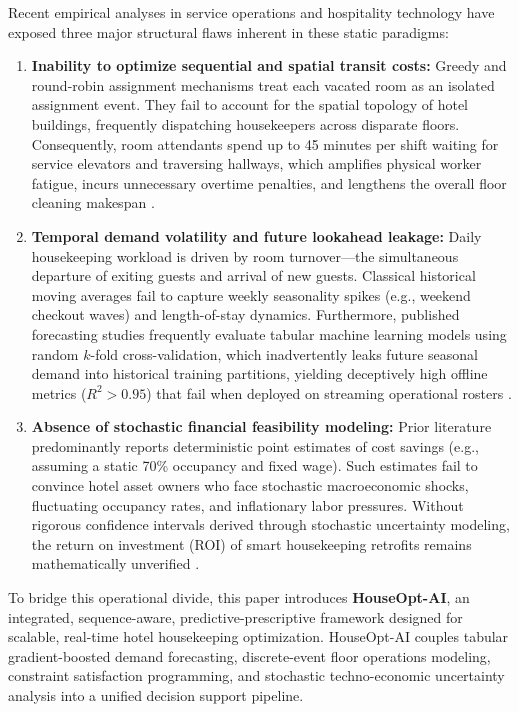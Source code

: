 \documentclass[11pt,a4paper]{article}
\begin{document}
Recent empirical analyses in service operations and hospitality technology have exposed three major structural flaws inherent in these static paradigms:
\begin{enumerate}
    \item \textbf{Inability to optimize sequential and spatial transit costs:} Greedy and round-robin assignment mechanisms treat each vacated room as an isolated assignment event. They fail to account for the spatial topology of hotel buildings, frequently dispatching housekeepers across disparate floors. Consequently, room attendants spend up to 45 minutes per shift waiting for service elevators and traversing hallways, which amplifies physical worker fatigue, incurs unnecessary overtime penalties, and lengthens the overall floor cleaning makespan \cite{chan2013,pizam2017}.
    \item \textbf{Temporal demand volatility and future lookahead leakage:} Daily housekeeping workload is driven by room turnover—the simultaneous departure of exiting guests and arrival of new guests. Classical historical moving averages fail to capture weekly seasonality spikes (e.g., weekend checkout waves) and length-of-stay dynamics. Furthermore, published forecasting studies frequently evaluate tabular machine learning models using random $k$-fold cross-validation, which inadvertently leaks future seasonal demand into historical training partitions, yielding deceptively high offline metrics ($R^2 > 0.95$) that fail when deployed on streaming operational rosters \cite{antonio2019,ampountolas2023}.
    \item \textbf{Absence of stochastic financial feasibility modeling:} Prior literature predominantly reports deterministic point estimates of cost savings (e.g., assuming a static 70\% occupancy and fixed wage). Such estimates fail to convince hotel asset owners who face stochastic macroeconomic shocks, fluctuating occupancy rates, and inflationary labor pressures. Without rigorous confidence intervals derived through stochastic uncertainty modeling, the return on investment (ROI) of smart housekeeping retrofits remains mathematically unverified \cite{lee2018,sainaghi2021}.
\end{enumerate}

To bridge this operational divide, this paper introduces \textbf{HouseOpt-AI}, an integrated, sequence-aware, predictive-prescriptive framework designed for scalable, real-time hotel housekeeping optimization. HouseOpt-AI couples tabular gradient-boosted demand forecasting, discrete-event floor operations modeling, constraint satisfaction programming, and stochastic techno-economic uncertainty analysis into a unified decision support pipeline.
\end{document}
